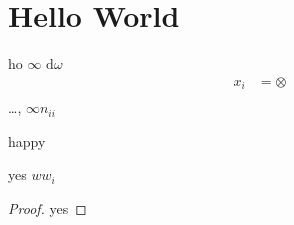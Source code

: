 \documentclass[12pt,class=article,crop=false]{standalone}
\begin{document}
\section{Hello World}
ho $ \infty \text{ d} \omega$ 
\begin{align*}
	x_i&= \otimes    \\ 
\end{align*} 	
\ldots, $ \infty n_{ii}$
\begin{lem}
happy
\end{lem}
\begin{problem}[3.1]

\end{problem}
\begin{thm}
yes $ ww_i$
\end{thm}
\begin{proof}
yes
\end{proof}
\end{document}
